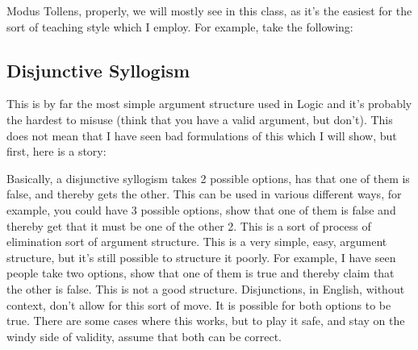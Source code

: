 Modus Tollens, properly, we will mostly see in this class, as it's the easiest for the sort of teaching style which I employ. For example, take the following:

    
\subsection{Disjunctive Syllogism}
\label{s:p1.3.3}

This is by far the most simple argument structure used in Logic and it's probably the hardest to misuse (think that you have a valid argument, but don't). This does not mean that I have seen bad formulations of this which I will show, but first, here is a story:

Basically, a disjunctive syllogism takes 2 possible options, has that one of them is false, and thereby gets the other. This can be used in various different ways, for example, you could have 3 possible options, show that one of them is false and thereby get that it must be one of the other 2. This is a sort of process of elimination sort of argument structure. This is a very simple, easy, argument structure, but it's still possible to structure it poorly. For example, I have seen people take two options, show that one of them is true and thereby claim that the other is false. This is not a good structure. Disjunctions, in English, without context, don't allow for this sort of move. It is possible for both options to be true. There are some cases where this works, but to play it safe, and stay on the windy side of validity, assume that both can be correct. 

